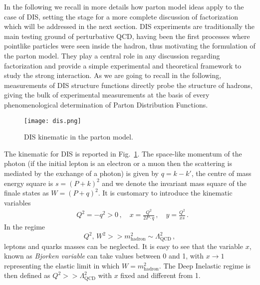 %
In the following we recall in more details how parton model ideas apply to the case of 
DIS, setting the stage for a more complete 
discussion of factorization which will be addressed in the next section. %
DIS experiments are traditionally the main testing ground of perturbative QCD,
having been the first processes where pointlike particles were seen inside the hadron, 
thus motivating the formulation of the parton model. 
They play a central role in any discussion regarding factorization and provide a simple experimental and theoretical framework to
study the strong interaction.
As we are going to recall in the following, measurements of DIS structure functions directly probe the structure of hadrons, 
giving the bulk of experimental measurements at the basis of every phenomenological determination of Parton Distribution Functions.

\begin{figure}[h!]
    \center
    \texttt{[image: dis.png]}
    \caption{DIS kinematic in the parton model.}
    \label{fig:DIS_kin}
\end{figure}

The kinematic for DIS is reported in Fig.~\ref{fig:DIS_kin}.
The space-like momentum of the photon (if the initial lepton is an electron or a muon then the scattering is 
mediated by the exchange of a photon) is given by $q = k - k'$, the centre of mass energy square is $s=\left(P+k\right)^2$ and
we denote the invariant mass square of the finale states as $W = \left(P+q\right)^2$.
It is customary to introduce the kinematic variables
\begin{align}
	\label{eq:DIS_kinematic}
    & Q^2 = -q^2 > 0\,, \,\,\,\,\,\, x = \frac{Q^2}{2P\cdot q}\,, \,\,\,\,\,\, y = \frac{Q^2}{x s}\,.
\end{align}
In the regime 
$$ Q^2,\, W^2 >> m^2_{\text{hadron}} \sim \Lambda^2_{\text{QCD}}\,, $$ 
leptons and quarks masses can be neglected.
It is easy to see that the variable $x$, known as \textit{Bjorken variable} can take values between 0 and 1, 
with $x\rightarrow 1$ representing the elastic limit in which $W=m^2_{\text{hadron}}$. The Deep Inelastic regime
is then defined as $Q^2 >> \Lambda^2_{\text{QCD}} $ with $x$ fixed and different from 1.


